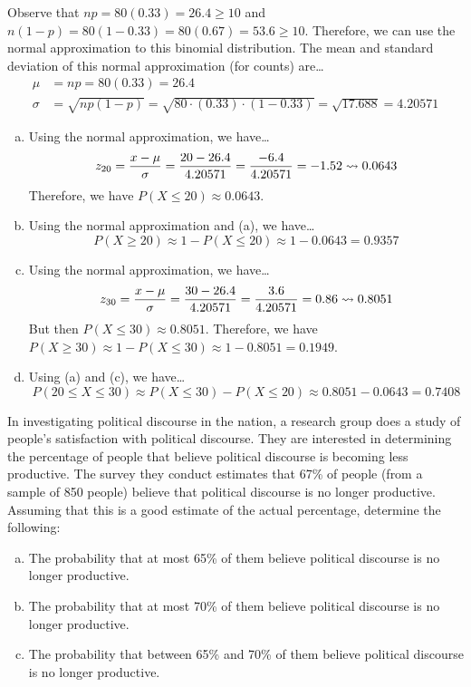 \documentclass[11pt,letterpaper]{article}
\begin{document}
\sol Observe that $np= 80(0.33)= 26.4 \geq 10$ and $n(1 - p)= 80(1 - 0.33)= 80(0.67)= 53.6 \geq 10$. Therefore, we can use the normal approximation to this binomial distribution. The mean and standard deviation of this normal approximation (for counts) are\dots
	\[
	\begin{aligned}
	\mu&= np= 80(0.33)= 26.4 \\[0.3cm]
	\sigma&= \sqrt{np(1 - p)}= \sqrt{80 \cdot (0.33) \cdot (1 - 0.33)}= \sqrt{17.688}= 4.20571
	\end{aligned}
	\] \pspace

\begin{enumerate}[(a)]
\item Using the normal approximation, we have\dots
	\[
	z_{20}= \dfrac{x - \mu}{\sigma}= \dfrac{20 - 26.4}{4.20571}= \dfrac{-6.4}{4.20571}= -1.52 \rightsquigarrow 0.0643
	\]
Therefore, we have $P(X \leq 20) \approx 0.0643$. \pspace

\item Using the normal approximation and (a), we have\dots
	\[
	P(X \geq 20) \approx 1 - P(X \leq 20) \approx 1 - 0.0643= 0.9357
	\] \pspace

\item Using the normal approximation, we have\dots
	\[
	z_{30}= \dfrac{x - \mu}{\sigma}= \dfrac{30 - 26.4}{4.20571}= \dfrac{3.6}{4.20571}= 0.86 \rightsquigarrow 0.8051
	\]
But then $P(X \leq 30) \approx 0.8051$. Therefore, we have $P(X \geq 30) \approx 1 - P(X \leq 30) \approx 1 - 0.8051= 0.1949$. \pspace

\item Using (a) and (c), we have\dots
	\[
	P(20 \leq X \leq 30) \approx P(X \leq 30) - P(X \leq 20) \approx 0.8051 - 0.0643= 0.7408
	\]
\end{enumerate}



\newpage



 In investigating political discourse in the nation, a research group does a study of people's satisfaction with political discourse. They are interested in determining the percentage of people that believe political discourse is becoming less productive. The survey they conduct estimates that 67\% of people (from a sample of 850 people) believe that political discourse is no longer productive. Assuming that this is a good estimate of the actual percentage, determine the following:
	\begin{enumerate}[(a)]
	\item The probability that at most 65\% of them believe political discourse is no longer productive. 
	\item The probability that at most 70\% of them believe political discourse is no longer productive. 
	\item The probability that between 65\% and 70\% of them believe political discourse is no longer productive. 
	\end{enumerate} \pspace
\end{document}

